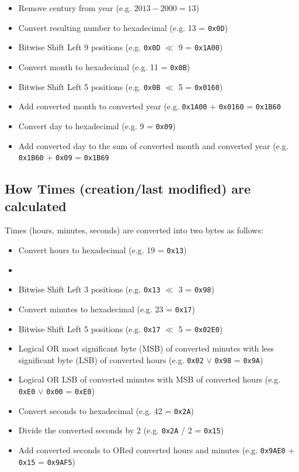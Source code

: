 \documentclass[a4paper,11pt]{article}
\begin{document}
    \begin{itemize}
        \item Remove century from year (e.g. $2013 - 2000 = 13$)
        \item Convert resulting number to hexadecimal (e.g. 13 = \texttt{0x0D})
        \item Bitwise Shift Left 9 positions (e.g. \texttt{0x0D} \(\ll\) 9 = 
        \texttt{0x1A00})
        \item Convert month to hexadecimal (e.g. 11 = \texttt{0x0B})
        \item Bitwise Shift Left 5 positions (e.g. \texttt{0x0B} \(\ll\) 5 = 
        \texttt{0x0160})
        \item Add converted month to converted year (e.g. \texttt{0x1A00} + 
        \texttt{0x0160} = \texttt{0x1B60}
        \item Convert day to hexadecimal (e.g. 9 = \texttt{0x09})
        \item Add converted day to the sum of converted month and converted year
        (e.g. \texttt{0x1B60} + \texttt{0x09} = \texttt{0x1B69}
    \end{itemize}

    \subsection{How Times (creation/last modified) are calculated}
    
    Times (hours, minutes, seconds) are converted into two bytes as follows:

    \begin{itemize}
        \item Convert hours to hexadecimal (e.g. 19 = \texttt{0x13})
        \item \item Bitwise Shift Left 3 positions (e.g. \texttt{0x13} \(\ll\) 3 = 
        \texttt{0x98})
        \item Convert minutes to hexadecimal (e.g. 23 = \texttt{0x17})
        \item Bitwise Shift Left 5 positions (e.g. \texttt{0x17} \(\ll\) 5 = 
        \texttt{0x02E0})
        \item Logical OR most significant byte (MSB) of converted minutes with
        less significant byte (LSB) of converted hours (e.g. \texttt{0x02}
        \(\lor\) \texttt{0x98} = \texttt{0x9A})
        \item Logical OR LSB of converted minutes with MSB of converted hours
        (e.g. \texttt{0xE0} \(\lor\) \texttt{0x00} = \texttt{0xE0})
        \item Convert seconds to hexadecimal (e.g. 42 = \texttt{0x2A})
        \item Divide the converted seconds by 2 (e.g. \texttt{0x2A} / 2 = 
        \texttt{0x15})
        \item Add converted seconds to ORed converted hours and minutes
        (e.g. \texttt{0x9AE0} + \texttt{0x15} = \texttt{0x9AF5})
    \end{itemize}
\end{document}
